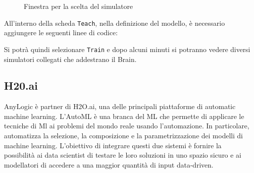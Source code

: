 \begin{figure}[!h]
    \centering
    \caption{Finestra per la scelta del simulatore}
    \label{fig:dialog}
\end{figure}
\clearpage
All'interno della scheda \texttt{Teach}, nella definizione del modello, è necessario aggiungere le seguenti linee di codice:

\begin{figure}[!h]
    \centering
    \label{fig:dialog}
\end{figure}

Si potrà quindi selezionare \texttt{Train} e dopo alcuni minuti si potranno vedere diversi simulatori collegati che addestrano il Brain. 


\subsection{H20.ai}
AnyLogic è partner di H2O.ai, una delle principali piattaforme di automatic machine learning. 
L’AutoML è una branca del ML che permette di applicare le tecniche di Ml ai problemi del mondo reale usando l’automazione. In particolare, automatizza la selezione, la composizione e la parametrizzazione dei modelli di machine learning.
L'obiettivo di integrare questi due sistemi è fornire la possibilità ai data scientist di testare le loro soluzioni in uno spazio sicuro e ai modellatori di accedere a una maggior quantità di input data-driven.

